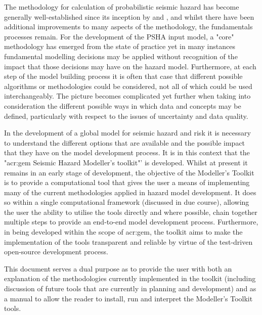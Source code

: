 The methodology for calculation of probabilistic seismic hazard has become generally well-established since its inception by \cite{cornell1968} and \cite{mcguire1976}, and whilst there have been additional improvements to many aspects of the methodology, the fundamentals processes remain. For the development of the PSHA input model, a "core" methodology has emerged from the state of practice yet in many instances fundamental modelling decisions may be applied without recognition of the impact that those decisions may have on the hazard model. Furthermore, at each step of the model building process it is often that case that different possible algorithms or methodologies could be considered, not all of which could be used interchangeably. The picture becomes complicated yet further when taking into consideration the different possible ways in which data and concepts may be defined, particularly with respect to the issues of uncertainty and data quality. 


In the development of a global model for seismic hazard and risk it is necessary to understand the different options that are available and the possible impact that they have on the model development process. It is in this context that the "\gls{acr:gem} Seismic Hazard Modeller's toolkit"' is developed. Whilst at present it remains in an early stage of development, the objective of the Modeller's Toolkit is to provide a computational tool that gives the user a means of implementing many of the current methodologies applied in hazard model development. It does so within a single computational framework (discussed in due course), allowing the user the ability to utilise the tools directly and where possible, chain together multiple steps to provide an end-to-end model development process. Furthermore, in being developed within the scope of \gls{acr:gem}, the toolkit aims to make the implementation of the tools transparent and reliable by virtue of the test-driven open-source development process.

This document serves a dual purpose as to provide the user with both an explanation of the methodologies currently implemented in the toolkit (including discussion of future tools that are currently in planning and development) and as a manual to allow the reader to install, run and interpret the Modeller's Toolkit tools. 